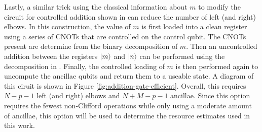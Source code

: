 Lastly, a similar trick using the classical information about $m$ to modify the circuit for controlled addition shown in \cite{gidney2018halving} can reduce the number of left (and right) elbows.
In this construction, the value of $m$ is first loaded into a clean register using a series of CNOTs that are controlled on the control qubit.
The CNOTs present are determine from the binary decomposition of $m$.
Then an uncontrolled addition between the registers $\ket{m}$ and $\ket{n}$ can be performed using the decomposition in \cite{gidney2018halving}.
Finally, the controlled loading of $m$ is then performed again to uncompute the ancillae qubits and return them to a useable state.
A diagram of this ciruit is shown in Figure \ref{fig:addition-gate-efficient}.
Overall, this requires $N - p - 1$ left (and right) elbows and $N + M - p - 1$ ancillae.
Since this option requires the fewest non-Clifford operations while only using a moderate amount of ancillae, this option will be used to determine the resource estimates used in this work.